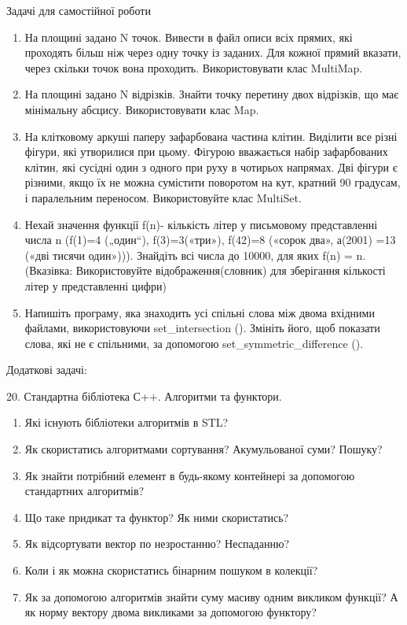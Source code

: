 \documentclass[]{article}
\makeatletter
\newcommand{\xslalph}[1]{\expandafter\@xslalph\csname c@#1\endcsname}
\newcommand{\@xslalph}[1]{%
    \ifcase#1\or а\or б\or в\or г\or д\or e\or є\or ж\or з\or i%
    \or й\or к\or л\or м\or н\or о\or п\or р\or с\or т%
    \or у\or ф\or х\or ц\or ч\or ш\or ю\or я\or аа\or бб\or вв%
    \else\@ctrerr\fi%
}
\makeatother
\begin{document}
\begin{enumerate}
\begin{enumerate}[label=\xslalph*)]
\begin{enumerate}
\begin{enumerate}[label=\xslalph*)]
Задачі для самостійної роботи

\begin{enumerate}
\def\labelenumi{\arabic{enumi})}
\item
  На площині задано N точок. Вивести в файл описи всіх прямих, які
  проходять більш ніж через одну точку із заданих. Для кожної прямий
  вказати, через скільки точок вона проходить. Використовувати клас
  MultiMap.
\item
  На площині задано N відрізків. Знайти точку перетину двох відрізків,
  що має мінімальну абсцису. Використовувати клас Map.
\item
  На клітковому аркуші паперу зафарбована частина клітин. Виділити все
  різні фігури, які утворилися при цьому. Фігурою вважається набір
  зафарбованих клітин, які сусідні один з одного при руху в чотирьох
  напрямах. Дві фігури є різними, якщо їх не можна сумістити поворотом
  на кут, кратний 90 градусам, і паралельним переносом. Використовуйте
  клас MultiSet.
\item
  Нехай значення функції f(n)- кількість літер у письмовому
  представленні числа n (f(1)=4 („один``), f(3)=3(«три»), f(42)=8
  («сорок два», а(2001) =13 («дві тисячи один»))). Знайдіть всі числа до
  10000, для яких f(n) = n. (Вказівка: Використовуйте
  відображення(словник) для зберігання кількості літер у представленні
  цифри)
\item
  Напишіть програму, яка знаходить усі спільні слова між двома вхідними
  файлами, використовуючи set\_intersection (). Змініть його, щоб
  показати слова, які не є спільними, за допомогою
  set\_symmetric\_difference ().
\end{enumerate}

Додаткові задачі:

20. Стандартна бібліотека С++. Алгоритми та функтори.

\begin{enumerate}
\def\labelenumi{\arabic{enumi})}
\item
  Які існують бібліотеки алгоритмів в STL?
\item
  Як скористатись алгоритмами сортування? Акумульованої суми? Пошуку?
\item
  Як знайти потрібний елемент в будь-якому контейнері за допомогою
  стандартних алгоритмів?
\item
  Що таке придикат та функтор? Як ними скористатись?
\item
  Як відсортувати вектор по незростанню? Неспаданню?
\item
  Коли і як можна скористатись бінарним пошуком в колекції?
\item
  Як за допомогою алгоритмів знайти суму масиву одним викликом функції?
  А як норму вектору двома викликами за допомогою функтору?
\end{enumerate}


\end{enumerate}
\end{enumerate}
\end{enumerate}
\end{enumerate}
\end{document}
